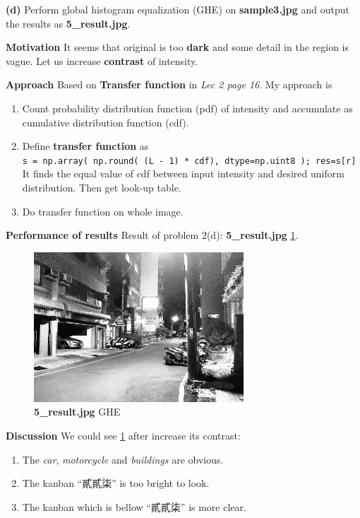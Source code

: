\textbf{(d)} Perform global histogram equalization (GHE) on \textbf{sample3.jpg} and
output the results as \textbf{5\_result.jpg}.

\textbf{Motivation}
It seems that original is too \textbf{dark} and some detail in the region is vague. Let us increase \textbf{contrast} of intensity.

\textbf{Approach}
Based on \textbf{Transfer function} in \textit{Lec 2 page 16}.
My approach is
\begin{enumerate}
\def\labelenumi{\arabic{enumi}.}
\tightlist
\item Count probability distribution function (pdf) of intensity and accumulate as cumulative distribution function (cdf).
\item Define \textbf{transfer function} as \\
\texttt{s\ =\ np.array(\ np.round(\ (L\ -\ 1)\ *\ cdf),\ dtype=np.uint8\ );\ res=s{[}r{]}} \\
It finds the equal value of cdf between input intensity and desired uniform distribution. Then get look-up table.
\item Do transfer function on whole image.
\end{enumerate}

\textbf{Performance of results}
Result of problem 2(d): \textbf{5\_result.jpg} \cref{fig2d}.
\begin{figure}
    \centering
    \includegraphics[width=0.7\textwidth]{image/5_result.jpg}
    \caption{\textbf{5\_result.jpg} GHE}
    \label{fig2d}
\end{figure}

\textbf{Discussion}
We could see \cref{fig2d} after increase its contrast:
\begin{enumerate}
  \item The \textit{car}, \textit{motorcycle} and \textit{buildings} are obvious.
  \item The kanban ``貳貳柒'' is too bright to look.
  \item The kanban which is bellow ``貳貳柒'' is more clear.
\end{enumerate}

